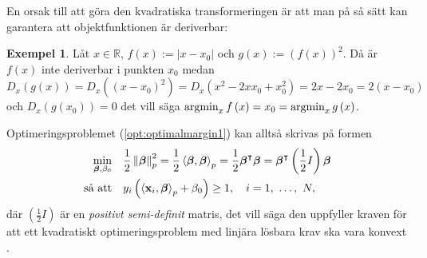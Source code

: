 \documentclass[a4paper, 12pt]{report}
\theoremstyle{definition}
\newtheorem{ex}{Exempel}[section]
\theoremstyle{remark}
\newcommand{\bfbeta}{{\boldsymbol{\beta}}}
\newcommand{\bfx}{\mathbf{x}}
\newcommand{\llangle}{\left\langle}
\newcommand{\rrangle}{\right\rangle}
\newcommand{\inner}[2]{\llangle #1, #2 \rrangle}
\begin{document}
En orsak till att göra den kvadratiska transformeringen är att man på så sätt kan garantera att objektfunktionen är deriverbar:
\begin{ex}
	Låt $x\in\mathbb{R}$, $f\left(x\right):=|x-x_0|$ och $g\left(x\right):=\left(f\left(x\right)\right)^2$. Då är $f\left(x\right)$ inte deriverbar i punkten $x_0$ medan $D_x\left(g\left(x\right)\right)=D_x\left(\left(x-x_0\right)^2\right)=D_x\left(x^2-2xx_0+x_0^2\right)=2x-2x_0=2\left(x-x_0\right)$ och $D_x\left(g\left(x_0\right)\right)=0$ det vill säga $\operatornamewithlimits{argmin}_x f\left(x\right) = x_0 = \operatornamewithlimits{argmin}_x g\left(x\right)$.
\end{ex}
Optimeringsproblemet (\ref{opt:optimalmargin1}) kan alltså skrivas på formen 
\begin{equation*}
\begin{aligned}
\operatornamewithlimits{min}_{\bfbeta, \beta_0} & & &\frac{1}{2}\left\|\bfbeta
\right\|_p^2=\frac{1}{2}\inner{\bfbeta}{\bfbeta}_p=\frac{1}{2}\bfbeta^\intercal\bfbeta=\bfbeta^\intercal\left(\frac{1}{2}I\right)\bfbeta\\
\text{så att} & & &y_i\left(\inner{\bfx_i}{\bfbeta}_p+\beta_0\right)\geq 1,\quad i=1,~\dots,~N,
\end{aligned}
\end{equation*}
där $\left( \frac{1}{2}I \right)$ är en \emph{positivt semi-definit} matris, det vill säga den uppfyller kraven för att ett kvadratiskt optimeringsproblem med linjära lösbara krav ska vara konvext \cite{Boyd}.
\end{document}
